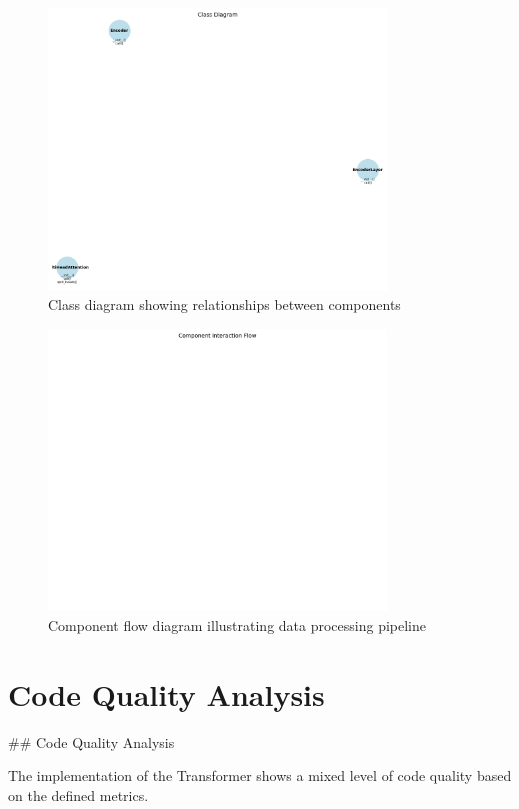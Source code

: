 \documentclass[10pt,journal,compsoc]{IEEEtran}
\begin{document}
\begin{figure}[h]
\centering
\includegraphics[width=0.8\textwidth]{figures/class_diagram.png}
\caption{Class diagram showing relationships between components}
\label{fig:class_diagram}
\end{figure}

\begin{figure}[h]
\centering
\includegraphics[width=0.8\textwidth]{figures/component_flow.png}
\caption{Component flow diagram illustrating data processing pipeline}
\label{fig:component_flow}
\end{figure}

\section{Code Quality Analysis}
## Code Quality Analysis

The implementation of the Transformer shows a mixed level of code quality based on the defined metrics.
\end{document}
